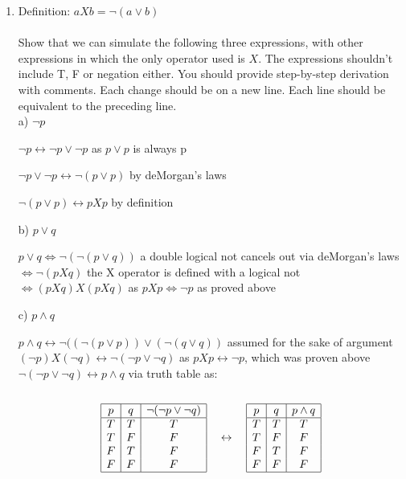 \documentclass[12pt]{article}
\begin{document}
\begin{enumerate}
\item       %
%
%
Definition:    $a X b = \neg ( a \lor  b)$\\\\
Show that we can simulate the following three expressions, with other expressions in which the only operator used is $X$. The expressions shouldn't include T, F or negation either.  You should provide step-by-step derivation with comments. Each change should be on a new line. Each line should be equivalent to the preceding line. \\
a) $\neg p$ \\

{\color{blue}

$\neg p \leftrightarrow \neg p \lor \neg p$ as $p\lor p$ is always p

$\neg p \lor \neg p \leftrightarrow \neg (p\lor p)$ by deMorgan's laws

$\neg(p\lor p)\leftrightarrow pXp$ by definition

}

\vskip1cm

b) $p\lor q$ \\

{\color{blue}
  $p\lor q \iff \neg (\neg (p\lor q))$ a double logical not cancels out via deMorgan's laws\\ 
  $\iff \neg(pXq)$ the X operator is defined with a logical not \\ 
  $\iff (pXq)X(pXq)$ as $pXp \iff \neg p$ as proved above

}

\vskip1cm

c) $p\land q$\\

{\color{blue}
$p\land q \leftrightarrow \neg((\neg(p\lor p))\lor(\neg(q\lor q))$ assumed for the sake of argument \\
$(\neg p) X (\neg q) \leftrightarrow \neg (\neg p \lor \neg q) $ as $pXp \leftrightarrow \neg p$, which was proven above \\
$\neg(\neg p \lor \neg q) \leftrightarrow p\land q $ via truth table as:\\\\

\[
\begin{array}{|c|c|c|}
\hline
p & q & \neg(\neg p \lor \neg q) \\
\hline
T & T & T \\
T & F & F \\
F & T & F \\
F & F & F \\
\hline
\end{array}
\quad \leftrightarrow \quad
\begin{array}{|c|c|c|}
\hline
p & q & p \land q \\
\hline
T & T & T \\
T & F & F \\
F & T & F \\
F & F & F \\
\hline
\end{array}
\]

}



\end{enumerate} 
\end{document}
